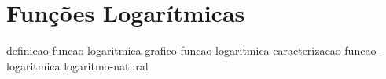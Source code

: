 \section{Funções Logarítmicas}

{definicao-funcao-logaritmica}
{grafico-funcao-logaritmica}
{caracterizacao-funcao-logaritmica}
{logaritmo-natural}